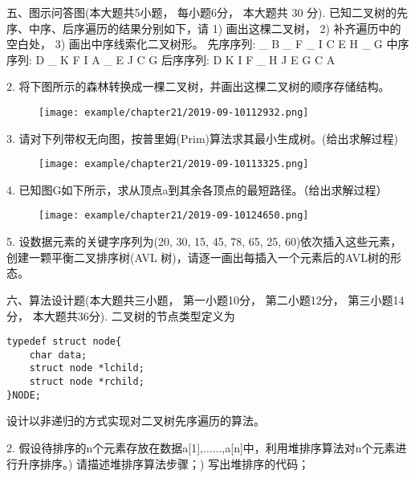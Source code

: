 五、图示问答图(本大题共5小题， 每小题6分， 本大题共 30 分). 已知二叉树的先序、中序、后序遍历的结果分别如下，请 
1) 画出这棵二叉树，
2) 补齐遍历中的空白处，
3) 画出中序线索化二叉树形。
先序序列: \_ B \_ F \_ I C E H \_ G
中序序列: D \_ K F I A \_ E J C G
后序序列: D K I F \_ H J E G C A

2. 将下图所示的森林转换成一棵二叉树，并画出这棵二叉树的顺序存储结构。\newline
\begin{figure}[H]
	\centering  %
	\texttt{[image: example/chapter21/2019-09-10112932.png]}
\end{figure} 

3. 请对下列带权无向图，按普里姆(Prim)算法求其最小生成树。(给出求解过程)\newline
\begin{figure}[H]
	\centering  %
	\texttt{[image: example/chapter21/2019-09-10113325.png]}
\end{figure} 

4. 已知图G如下所示，求从顶点a到其余各顶点的最短路径。（给出求解过程）\newline
\begin{figure}[H]
	\centering  %
	\texttt{[image: example/chapter21/2019-09-10124650.png]}
\end{figure} 

5. 设数据元素的关键字序列为(20, 30, 15, 45, 78, 65, 25, 60)依次插入这些元素，创建一颗平衡二叉排序树(AVL 树)，请逐一画出每插入一个元素后的AVL树的形态。\newline

六、算法设计题(本大题共三小题， 第一小题10分， 第二小题12分， 第三小题14分， 本大题共36分). 二叉树的节点类型定义为\newline

\begin{lstlisting}[basicstyle=\small\ttfamily, caption={}, numbers=none]
typedef struct node{
	char data;
	struct node *lchild;
	struct node *rchild;
}NODE;
\end{lstlisting}
设计以非递归的方式实现对二叉树先序遍历的算法。\newline

2. 假设待排序的n个元素存放在数据a[1],......,a[n]中，利用堆排序算法对n个元素进行升序排序。) 请描述堆排序算法步骤；) 写出堆排序的代码； \newline


